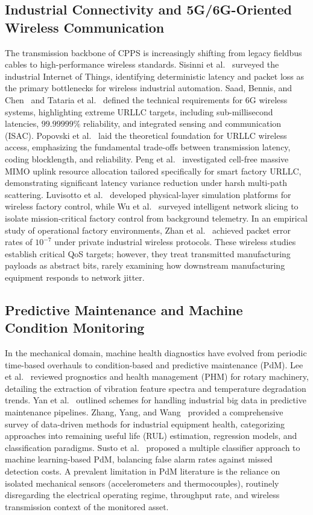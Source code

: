 \documentclass[journal]{IEEEtran}
\begin{document}
\subsection{Industrial Connectivity and 5G/6G-Oriented Wireless Communication}
The transmission backbone of CPPS is increasingly shifting from legacy fieldbus cables to high-performance wireless standards. Sisinni et al.~\cite{Sisinni2018} surveyed the industrial Internet of Things, identifying deterministic latency and packet loss as the primary bottlenecks for wireless industrial automation. Saad, Bennis, and Chen~\cite{Saad2020} and Tataria et al.~\cite{Tataria2021} defined the technical requirements for 6G wireless systems, highlighting extreme URLLC targets, including sub-millisecond latencies, $99.99999\%$ reliability, and integrated sensing and communication (ISAC). Popovski et al.~\cite{Popovski2018} laid the theoretical foundation for URLLC wireless access, emphasizing the fundamental trade-offs between transmission latency, coding blocklength, and reliability. Peng et al.~\cite{Peng2023} investigated cell-free massive MIMO uplink resource allocation tailored specifically for smart factory URLLC, demonstrating significant latency variance reduction under harsh multi-path scattering. Luvisotto et al.~\cite{Luvisotto2017} developed physical-layer simulation platforms for wireless factory control, while Wu et al.~\cite{Wu2022} surveyed intelligent network slicing to isolate mission-critical factory control from background telemetry. In an empirical study of operational factory environments, Zhan et al.~\cite{Zhan2020} achieved packet error rates of $10^{-7}$ under private industrial wireless protocols. These wireless studies establish critical QoS targets; however, they treat transmitted manufacturing payloads as abstract bits, rarely examining how downstream manufacturing equipment responds to network jitter.

\subsection{Predictive Maintenance and Machine Condition Monitoring}
In the mechanical domain, machine health diagnostics have evolved from periodic time-based overhauls to condition-based and predictive maintenance (PdM). Lee et al.~\cite{Lee2014} reviewed prognostics and health management (PHM) for rotary machinery, detailing the extraction of vibration feature spectra and temperature degradation trends. Yan et al.~\cite{Yan2017} outlined schemes for handling industrial big data in predictive maintenance pipelines. Zhang, Yang, and Wang~\cite{Zhang2019} provided a comprehensive survey of data-driven methods for industrial equipment health, categorizing approaches into remaining useful life (RUL) estimation, regression models, and classification paradigms. Susto et al.~\cite{Susto2015} proposed a multiple classifier approach to machine learning-based PdM, balancing false alarm rates against missed detection costs. A prevalent limitation in PdM literature is the reliance on isolated mechanical sensors (accelerometers and thermocouples), routinely disregarding the electrical operating regime, throughput rate, and wireless transmission context of the monitored asset.
\end{document}
